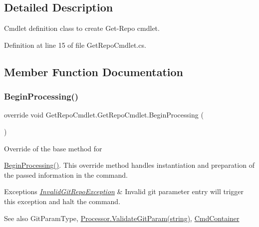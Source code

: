 \subsection{Detailed Description}
Cmdlet definition class to create Get-\/\+Repo cmdlet. 



Definition at line 15 of file Get\+Repo\+Cmdlet.\+cs.



\subsection{Member Function Documentation}
\mbox{\label{class_get_repo_cmdlet_1_1_get_repo_cmdlet_a22503338cdb62a648a848cd8fcbf7769}} 
\subsubsection{\texorpdfstring{Begin\+Processing()}{BeginProcessing()}}
{\footnotesize\ttfamily override void Get\+Repo\+Cmdlet.\+Get\+Repo\+Cmdlet.\+Begin\+Processing (\begin{DoxyParamCaption}{ }\end{DoxyParamCaption})\hspace{0.3cm}{\ttfamily [protected]}}



Override of the base method for 

{\ttfamily \mbox{\hyperlink{class_get_repo_cmdlet_1_1_get_repo_cmdlet_a22503338cdb62a648a848cd8fcbf7769}{Begin\+Processing()}}}. This override method handles instantiation and preparation of the passed information in the command. 


\begin{DoxyExceptions}{Exceptions}
{\em \mbox{\hyperlink{class_get_repo_cmdlet_1_1_invalid_git_repo_exception}{Invalid\+Git\+Repo\+Exception}}} & Invalid git parameter entry will trigger this exception and halt the command. \\
\hline
\end{DoxyExceptions}
\begin{DoxySeeAlso}{See also}
Git\+Param\+Type, \mbox{\hyperlink{class_get_repo_cmdlet_1_1_processor_a0fba012ba15720a0fcd419c44b757c5b}{Processor.\+Validate\+Git\+Param(string)}}, \mbox{\hyperlink{class_get_repo_cmdlet_1_1_cmd_container}{Cmd\+Container}}


\end{DoxySeeAlso}


